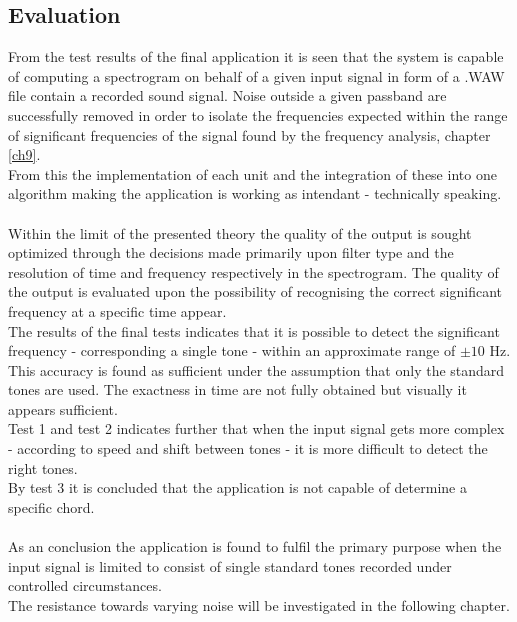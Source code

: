 \subsection{Evaluation}
From the test results of the final application it is seen that the system is capable of computing a spectrogram on behalf of a given input signal in form of a .WAW file contain a recorded sound signal. Noise outside a given passband are successfully removed in order to isolate the frequencies expected within the range of significant frequencies of the signal found by the frequency analysis, chapter \ref{ch9}. \\
From this the implementation of each unit and the integration of these into one algorithm making the application is working as intendant - technically speaking. \\
\\
Within the limit of the presented theory the quality of the output is sought optimized through the decisions made primarily upon filter type and the resolution of time and frequency respectively in the spectrogram.   
The quality of the output is evaluated upon the possibility of recognising the correct significant frequency at a specific time appear. \\ 
The results of the final tests indicates that it is possible to detect the significant frequency - corresponding a single tone - within an approximate range of $\pm 10$ Hz. This accuracy is found as sufficient under the assumption that only the standard tones are used. The exactness in time are not fully obtained but visually it appears sufficient.\\        
Test 1 and test 2 indicates further that when the input signal gets more complex - according to speed and shift between tones - it is more difficult to detect the right tones. \\
By test 3 it is concluded that the application is not capable of determine a specific chord.\\   
\\
As an conclusion the application is found to fulfil the primary purpose when the input signal is limited to consist of single standard tones recorded under controlled circumstances.\\
The resistance towards varying noise will be investigated in the following chapter.           